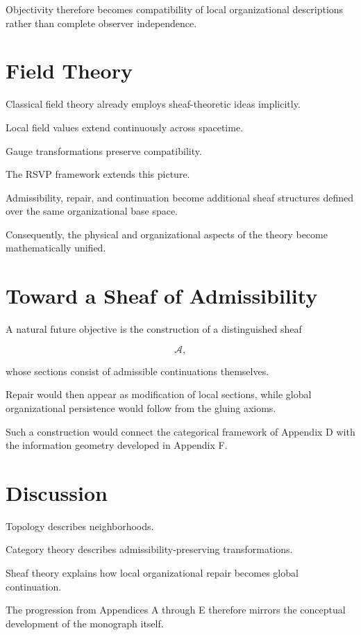 \documentclass[11pt,oneside]{book}
\numberwithin{equation}{chapter}
\theoremstyle{definition}
\theoremstyle{plain}
\begin{document}
Objectivity therefore becomes compatibility of local organizational
descriptions rather than complete observer independence.

\section{Field Theory}

Classical field theory already employs sheaf-theoretic ideas implicitly.

Local field values extend continuously across spacetime.

Gauge transformations preserve compatibility.

The RSVP framework extends this picture.

Admissibility, repair, and continuation become additional sheaf
structures defined over the same organizational base space.

Consequently, the physical and organizational aspects of the theory
become mathematically unified.

\section{Toward a Sheaf of Admissibility}

A natural future objective is the construction of a distinguished sheaf

\[
\mathcal A,
\]

whose sections consist of admissible continuations themselves.

Repair would then appear as modification of local sections, while global
organizational persistence would follow from the gluing axioms.

Such a construction would connect the categorical framework of Appendix D
with the information geometry developed in Appendix F.

\section{Discussion}

Topology describes neighborhoods.

Category theory describes admissibility-preserving transformations.

Sheaf theory explains how local organizational repair becomes global
continuation.

The progression from Appendices A through E therefore mirrors the
conceptual development of the monograph itself.
\end{document}
